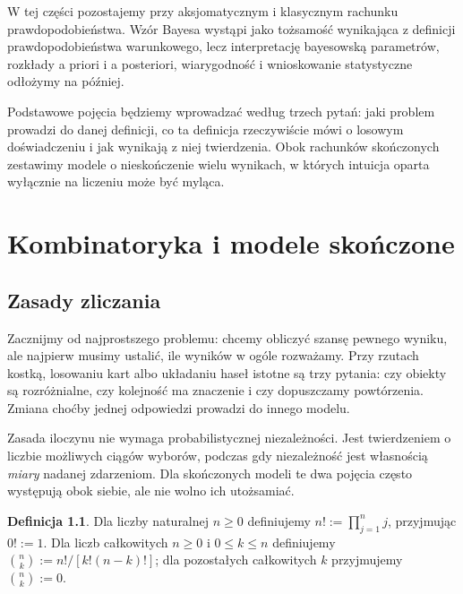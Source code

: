 \documentclass[11pt,a4paper,oneside]{report}
\numberwithin{equation}{chapter}
\theoremstyle{plain}
\theoremstyle{definition}
\newtheorem{definicja}{Definicja}[chapter]
\theoremstyle{remark}
\begin{document}
W tej części pozostajemy przy aksjomatycznym i klasycznym rachunku
prawdopodobieństwa. Wzór Bayesa wystąpi jako tożsamość wynikająca
z definicji prawdopodobieństwa warunkowego, lecz interpretację
bayesowską parametrów, rozkłady a priori i a posteriori,
wiarygodność i wnioskowanie statystyczne odłożymy na później.

Podstawowe pojęcia będziemy wprowadzać według trzech pytań: jaki
problem prowadzi do danej definicji, co ta definicja rzeczywiście
mówi o losowym doświadczeniu i jak wynikają z niej twierdzenia.
Obok rachunków skończonych zestawimy modele o nieskończenie
wielu wynikach, w których intuicja oparta wyłącznie na liczeniu
może być myląca.

\chapter{Kombinatoryka i modele skończone}

\section{Zasady zliczania}
Zacznijmy od najprostszego problemu: chcemy obliczyć szansę
pewnego wyniku, ale najpierw musimy ustalić, ile wyników w ogóle
rozważamy. Przy rzutach kostką, losowaniu kart albo układaniu haseł
istotne są trzy pytania: czy obiekty są rozróżnialne, czy kolejność
ma znaczenie i czy dopuszczamy powtórzenia. Zmiana choćby jednej
odpowiedzi prowadzi do innego modelu.

Zasada iloczynu nie wymaga probabilistycznej niezależności.
Jest twierdzeniem o liczbie możliwych ciągów wyborów, podczas gdy
niezależność jest własnością \emph{miary} nadanej zdarzeniom.
Dla skończonych modeli te dwa pojęcia często występują obok siebie,
ale nie wolno ich utożsamiać.

\begin{definicja}
Dla liczby naturalnej $n\geq 0$ definiujemy $n!:=\prod_{j=1}^n j$, przyjmując $0!:=1$.
Dla liczb całkowitych $n\geq0$ i $0\leq k\leq n$ definiujemy
$\binom nk:=n!/[k!(n-k)!]$; dla pozostałych całkowitych $k$ przyjmujemy
$\binom nk:=0$.
\end{definicja}
\end{document}
